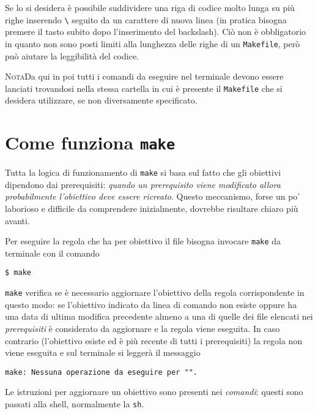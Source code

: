 Se lo si desidera è possibile suddividere una riga di codice molto lunga su più
righe inserendo \texttt{\textbackslash{}} seguito da un carattere di nuova linea
(in pratica bisogna premere il tasto  subito dopo l'inserimento del
backslash).  Ciò non è obbligatorio in quanto non sono posti limiti alla
lunghezza delle righe di un \texttt{Makefile}, però può aiutare la leggibilità
del codice.

\textsc{Nota}\quad Da qui in poi tutti i comandi da eseguire nel terminale
devono essere lanciati trovandosi nella stessa cartella in cui è presente il
\texttt{Makefile} che si desidera utilizzare, se non diversamente specificato.

\section{Come funziona \texttt{make}}
\label{sec:come-funziona}

Tutta la logica di funzionamento di \texttt{make} si basa sul fatto che gli
obiettivi dipendono dai prerequisiti:
\emph{quando un prerequisito viene modificato allora probabilmente l'obiettivo
  deve essere ricreato}.
Questo meccanismo, forse un po' laborioso e difficile da comprendere
inizialmente, dovrebbe risultare chiaro più avanti.

Per eseguire la regola che ha per obiettivo il file  bisogna
invocare \texttt{make} da terminale con il comando
\begin{sintassi}
  \small \texttt{\$ make} 
\end{sintassi}
\texttt{make} verifica se è necessario aggiornare l'obiettivo della regola
corrispondente in questo modo: se l'obiettivo indicato da linea di comando non
esiste oppure ha una data di ultima modifica precedente almeno a una di quelle
dei file elencati nei \emph{prerequisiti} è considerato da aggiornare e la
regola viene eseguita.  In caso contrario (l'obiettivo esiste ed è più recente
di tutti i prerequisiti) la regola non viene eseguita e sul terminale si leggerà
il messaggio
\begin{flushleft}
  \texttt{make: Nessuna operazione da eseguire per "}\texttt{".}
\end{flushleft}
Le istruzioni per aggiornare un obiettivo sono
presenti nei \emph{comandi}: questi sono passati alla shell, normalmente la
\texttt{sh}.

